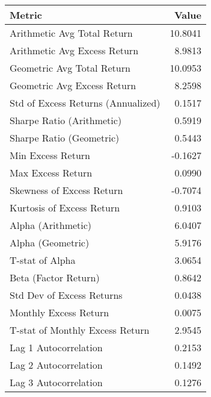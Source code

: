 \begin{tabular}{lr}
\toprule
Metric & Value \\
\midrule
Arithmetic Avg Total Return & 10.8041 \\
Arithmetic Avg Excess Return & 8.9813 \\
Geometric Avg Total Return & 10.0953 \\
Geometric Avg Excess Return & 8.2598 \\
Std of Excess Returns (Annualized) & 0.1517 \\
Sharpe Ratio (Arithmetic) & 0.5919 \\
Sharpe Ratio (Geometric) & 0.5443 \\
Min Excess Return & -0.1627 \\
Max Excess Return & 0.0990 \\
Skewness of Excess Return & -0.7074 \\
Kurtosis of Excess Return & 0.9103 \\
Alpha (Arithmetic) & 6.0407 \\
Alpha (Geometric) & 5.9176 \\
T-stat of Alpha & 3.0654 \\
Beta (Factor Return) & 0.8642 \\
Std Dev of Excess Returns & 0.0438 \\
Monthly Excess Return & 0.0075 \\
T-stat of Monthly Excess Return & 2.9545 \\
Lag 1 Autocorrelation & 0.2153 \\
Lag 2 Autocorrelation & 0.1492 \\
Lag 3 Autocorrelation & 0.1276 \\
\bottomrule
\end{tabular}
